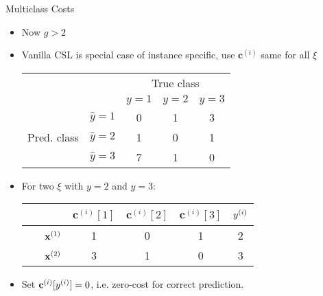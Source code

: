 \documentclass[11pt,compress,t,notes=noshow, xcolor=table]{beamer}
\newcommand{\cv}{\mathbf{c}}    %
\begin{document}
\begin{vbframe}{Multiclass Costs}
    \begin{itemize}
        \footnotesize
        \item Now $g > 2$

        \item Vanilla CSL is special case of instance specific, use $\cv^{(i)}$ same for all $\xi$
        
        \vspace{5pt}
        \begin{center}
                            \begin{tabular}{cc|ccc}
        			& &\multicolumn{3}{c}{True class} \\
        			& & $y=1$ & $y=2$ & $y=3$  \\
        			\hline
        			\multirow{3}{*}{\parbox{0.6cm}{Pred.  class}} & $\hat y=1$ & 0 & 1 & 3\\
        			& $\hat y=2$ & 1 & 0 & 1\\
                        & $\hat y=3$ & 7 & 1 & 0\\
                \end{tabular}
        \end{center}
        \vspace{5pt}
        
        \item For two $\xi$ with $y=2$ and $y = 3$: %
                \begin{center}
                            \begin{tabular}{cc|cccc}\
        			& & $\cv^{(i)}[1]$ & $\cv^{(i)}[2]$ & $\cv^{(i)}[3]$ & $y^{(i)}$ \\
        			\hline & $\mathbf{x}^{(1)}$ & 1 & 0 & 1 & 2\\
        			& $\mathbf{x}^{(2)}$ & 3 & 1 & 0 & 3\\
                \end{tabular}
        \end{center}
        
        \item Set $\cv^{(i)}[\yi] = 0$, i.e. zero-cost for correct prediction.
        \vspace{5pt}
        
            
    \end{itemize}
\end{vbframe}
\end{document}
